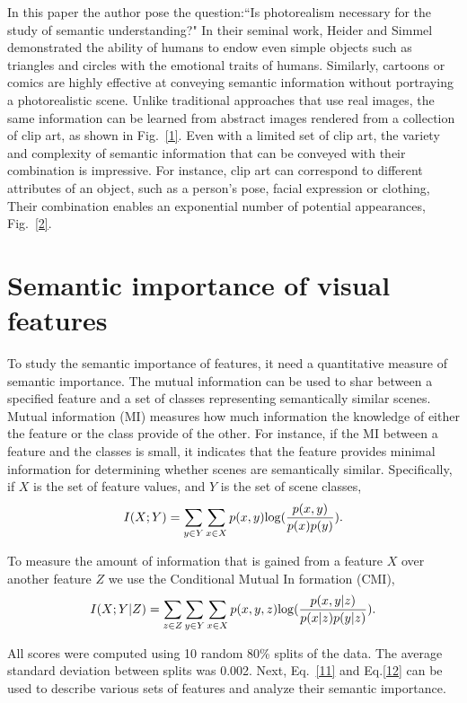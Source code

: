 \documentclass[10pt,twocolumn,letterpaper]{article}
\begin{document}
In this paper the author pose the question:``Is photorealism necessary for the study of semantic understanding?" In their seminal work, Heider and Simmel demonstrated the ability of humans to endow even simple objects such as triangles and circles with the emotional traits of humans. Similarly, cartoons or comics are highly effective at conveying semantic information without portraying a photorealistic scene. Unlike traditional approaches that use real images, the same information can be learned from abstract images rendered from a collection of clip art, as shown in Fig.~\ref{1}. Even with a limited set of clip art, the variety and complexity of semantic information that can be conveyed with their combination is impressive\cite{Berg2012}. For instance, clip art can correspond to different attributes of an object, such as a person's pose, facial expression or clothing, Their combination enables an exponential number of potential appearances, Fig.~\ref{2}.
\section{Semantic importance of visual features}
To study the semantic importance of features, it need a quantitative measure of semantic importance. The mutual information can be used to shar between a specified feature and a set of classes representing semantically similar scenes. Mutual information (MI) measures how much information the knowledge of either the feature or the class provide of the other. For instance, if the MI between a feature and the classes is small, it indicates that the feature provides minimal information for determining whether scenes are semantically similar. Specifically, if $X$ is the set of feature values, and $Y$ is the set of scene classes,
\begin{equation}\label{11}
\begin{split}
I(X;Y)=\sum_{y\in Y}\sum_{x\in X}p(x,y){\rm log}(\frac{p(x,y)}{p(x)p(y)}).
\end{split}
\end{equation}
\par 
To measure the amount of information that is gained from a feature $X$ over another feature $Z$ we use the Conditional Mutual In formation (CMI),
\begin{equation}\label{12}
\begin{split}
I(X;Y|Z)=\sum_{z\in Z}\sum_{y\in Y}\sum_{x\in X}p(x,y,z){\rm log}(\frac{p(x,y|z)}{p(x|z)p(y|z)}).
\end{split}
\end{equation}
\par
All scores were computed using 10 random 80\% splits of the data. The average standard deviation between splits was 0.002. Next, Eq.~\ref{11} and Eq.\ref{12} can be used to describe various sets of features and analyze their semantic importance\cite{Desai2010Discriminative}.
{\small


}
\end{document}
